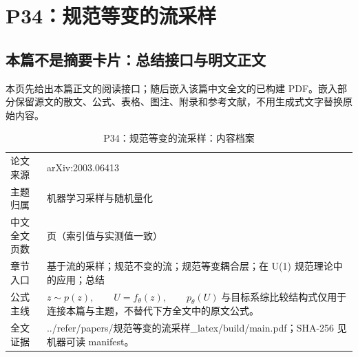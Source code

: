 \documentclass[UTF8,11pt,oneside]{ctexbook}
\begin{document}
\chapter{P34：规范等变的流采样}
\section*{本篇不是摘要卡片：总结接口与明文正文}
本页先给出本篇正文的阅读接口；随后嵌入该篇中文全文的已构建 PDF。嵌入部分保留源文的散文、公式、表格、图注、附录和参考文献，不用生成式文字替换原始内容。
\begin{table}[htbp]
  \centering
  \caption{P34：规范等变的流采样：内容档案}
  \small
  \begin{tabularx}{0.96\textwidth}{@{}p{3.3cm}>{\raggedright\arraybackslash}X@{}}
    \toprule
    论文来源 & arXiv:2003.06413 \\
    主题归属 & 机器学习采样与随机量化 \\
    中文全文页数 & 11 页（索引值与实测值一致） \\
    章节入口 & 基于流的采样；规范不变的流；规范等变耦合层；在 U(1) 规范理论中的应用；总结 \\
    公式主线 & $z\sim p(z),\qquad U=f_\theta(z),\qquad p_\theta(U)\;\text{与目标系综比较}$\newline\scriptsize 结构式仅用于连接本篇与主题，不替代下方全文中的原文公式。 \\
    全文证据 & ../\allowbreak{}refer/\allowbreak{}papers/\allowbreak{}规范等变的流采样\_\allowbreak{}latex/\allowbreak{}build/\allowbreak{}main.pdf；SHA-256 见机器可读 manifest。 \\
    \bottomrule
  \end{tabularx}
\end{table}
\end{document}
